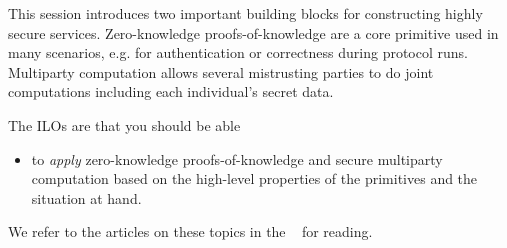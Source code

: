 This session introduces two important building blocks for constructing highly 
secure services. Zero-knowledge proofs-of-knowledge are a core primitive used 
in many scenarios, e.g. for authentication or correctness during protocol runs. 
Multiparty computation allows several mistrusting parties to do joint 
computations including each individual's secret data.

The \acp{ILO} are that you should be able
\begin{itemize}
  \item to \emph{apply} zero-knowledge proofs-of-knowledge and secure 
    multiparty computation based on the high-level properties of the primitives 
    and the situation at hand.
\end{itemize}

We refer to the articles on these topics in the ~\cite{EOCS} 
for reading.
